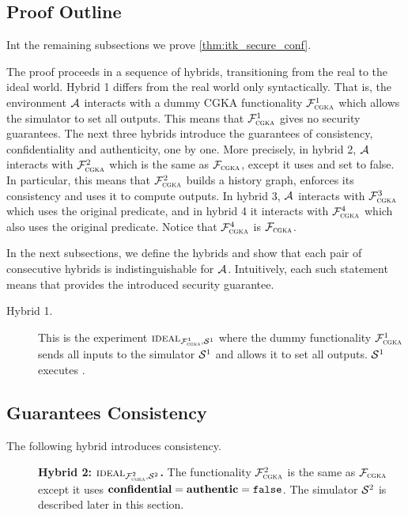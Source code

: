 \subsection{Proof Outline}
Int the remaining subsections we prove \cref{thm:itk_secure_conf}.

The proof proceeds in a sequence of hybrids, transitioning from the real to the ideal world. Hybrid 1 differs from the real world only syntactically. That is, the environment $\mathcal{A}_{\relax}$ interacts with a dummy CGKA functionality $\mathcal{F}_{\normalfont\textsc{cgka}}^1$ which allows the simulator to set all outputs. This means that $\mathcal{F}_{\normalfont\textsc{cgka}}^1$ gives no security guarantees. The next three hybrids introduce the guarantees of consistency, confidentiality and authenticity, one by one. More precisely, in hybrid 2, $\mathcal{A}_{\relax}$ interacts with $\mathcal{F}_{\normalfont\textsc{cgka}}^2$ which is the same as $\mathcal{F}_{\normalfont\textsc{cgka}}$, except it uses \KwConf{} and \KwAuth{} set to false. In particular, this means that $\mathcal{F}_{\normalfont\textsc{cgka}}^2$ builds a history graph, enforces its consistency and uses it to compute outputs. In hybrid 3, $\mathcal{A}_{\relax}$ interacts with $\mathcal{F}_{\normalfont\textsc{cgka}}^3$ which uses the original \KwConf{} predicate, and in hybrid 4 it interacts with $\mathcal{F}_{\normalfont\textsc{cgka}}^4$ which also uses the original \KwAuth{} predicate. Notice that $\mathcal{F}_{\normalfont\textsc{cgka}}^4$ is $\mathcal{F}_{\normalfont\textsc{cgka}}$.

In the next subsections, we define the hybrids and show that each pair of consecutive hybrids is indistinguishable for $\mathcal{A}_{\relax}$. Intuitively, each such statement means that \saik provides the introduced security guarantee.

\begin{description}
  \item[Hybrid 1.] This is the experiment $\textnormal{\textsc{ideal}}_{\mathcal{F}_{\normalfont\textsc{cgka}}^1, \mathcal{S}_{\textsc{\relax}}^1}$ where the dummy functionality $\mathcal{F}_{\normalfont\textsc{cgka}}^1$ sends all inputs to the simulator $\mathcal{S}_{\textsc{\relax}}^1$ and allows it to set all outputs. $\mathcal{S}_{\textsc{\relax}}^1$ executes \saik.
\end{description}

\subsection{\saik Guarantees Consistency}\label{sec:protsec3}
The following hybrid introduces consistency.
\begin{description}
  \item[] {\bf Hybrid 2: $\textnormal{\textsc{ideal}}_{\mathcal{F}_{\normalfont\textsc{cgka}}^2, \mathcal{S}_{\textsc{\relax}}^2}$.} The functionality $\mathcal{F}_{\normalfont\textsc{cgka}}^2$ is the same as $\mathcal{F}_{\normalfont\textsc{cgka}}$ except it uses $\textnormal{\textbf{confidential}}{}=\textnormal{\textbf{authentic}}{}={\normalfont\texttt{false}}$. The simulator $\mathcal{S}_{\textsc{\relax}}^2$ is described later in this section.
\end{description}

